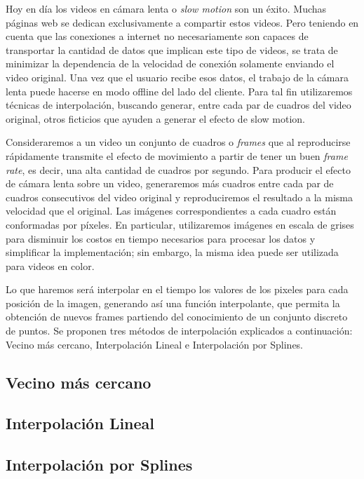 \par Hoy en día los videos en cámara lenta o \textit{slow motion }son un éxito. Muchas páginas web se dedican exclusivamente a compartir estos videos. Pero teniendo en cuenta que las conexiones a internet no necesariamente son capaces de transportar la cantidad de datos que implican este tipo de videos, se trata de minimizar la dependencia de la velocidad de conexión solamente enviando el video original. Una vez que el usuario recibe esos datos, el trabajo de la cámara lenta puede hacerse en modo offline del lado del cliente. Para tal fin utilizaremos técnicas de interpolación, buscando generar, entre cada par de cuadros del video original, otros ficticios que ayuden a generar el efecto de slow motion.

\par Consideraremos a un video un conjunto de cuadros o \textit{frames} que al reproducirse rápidamente transmite el efecto de movimiento a partir de tener un buen \textit{frame rate}, es decir, una alta cantidad de cuadros por segundo. Para producir el efecto de cámara lenta sobre un video, generaremos más cuadros entre cada par de cuadros consecutivos del video original y reproduciremos el resultado a la misma velocidad que el original. Las im\'agenes correspondientes a cada cuadro est\'an conformadas por p\'ixeles. En particular, utilizaremos im\'agenes en escala de grises para disminuir los costos en tiempo necesarios para procesar los datos y simplificar la implementaci\'on; sin embargo, la misma idea puede ser utilizada para videos en color. 

\par Lo que haremos será interpolar en el tiempo los valores de los pixeles para cada posición de la imagen, generando así una función interpolante, que permita la obtención de nuevos frames partiendo del conocimiento de un conjunto discreto de puntos. Se proponen tres métodos de interpolación explicados a continuación: Vecino más cercano, Interpolación Lineal e Interpolación por Splines.

\subsection{Vecino más cercano}



\subsection{Interpolación Lineal}



\newpage

\subsection{Interpolación por Splines}

